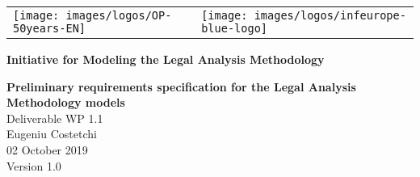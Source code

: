
\newcommand{\DelTitle}{Preliminary requirements specification for the Legal Analysis Methodology models}
\newcommand{\DelNumber}{WP 1.1}
\newcommand{\DelVersion}{1.0}
\newcommand{\DelAuthor}{Eugeniu Costetchi}
\newcommand{\DelDate}{02 October 2019}
\newcommand{\DelFilename}{wp1-1-ontology-requirements}


\pagestyle{empty}
\graphicspath{{figures/}}

\begin{titlepage}
\begin{center}

\begin{center}
	\begin{center}
		\setlength{\tabcolsep}{0pt}
		\begin{tabular}{>{\raggedleft}m{3.5cm}>{\centering}m{\dimexpr\textwidth - 8cm\relax}>{\raggedright}m{3.5cm}}
			\texttt{[image: images/logos/OP-50years-EN]}%
			&%
			&%
			\texttt{[image: images/logos/infeurope-blue-logo]} %
		\end{tabular}
	\end{center}


  \vspace{2mm}

  \end{center}
  \vspace{4cm}
  \textbf{{\large Initiative for Modeling the Legal Analysis Methodology\\}}
  \vspace{2cm}
  
  \begin{spacing}{2.5}
    \textbf{\Huge \DelTitle}\\ \vspace{2cm}
    {\large Deliverable \DelNumber} \\ %
	{\large \DelAuthor} \\ %
	{\large \DelDate} \\ %
    {\large Version \DelVersion}
  \end{spacing}
  
  \vspace*{\fill}


\end{center}
\end{titlepage}

